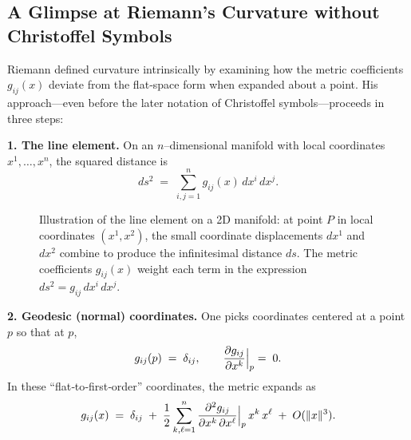 \subsection{A Glimpse at Riemann’s Curvature without Christoffel Symbols}

Riemann defined curvature intrinsically by examining how the metric coefficients \(g_{ij}(x)\) deviate from the flat‐space form when expanded about a point.  His approach—even before the later notation of Christoffel symbols—proceeds in three steps:

\textbf{1. The line element.}  On an \(n\)–dimensional manifold with local coordinates \(x^1,\dots,x^n\), the squared distance is
\[
ds^2 \;=\; \sum_{i,j=1}^n g_{ij}(x)\,dx^i\,dx^j.
\]


\begin{figure}[H]
    \centering
    \caption{%
    Illustration of the line element on a 2D manifold: at point \(P\) in local coordinates \((x^1,x^2)\), 
    the small coordinate displacements \(dx^1\) and \(dx^2\) combine to produce the infinitesimal distance \(ds\).  
    The metric coefficients \(g_{ij}(x)\) weight each term in the expression \(ds^2 = g_{ij}\,dx^i\,dx^j\).}
\end{figure}


\textbf{2. Geodesic (normal) coordinates.}  One picks coordinates centered at a point \(p\) so that at \(p\),
\[
g_{ij}(p) \;=\;\delta_{ij},
\qquad
\frac{\partial g_{ij}}{\partial x^k}\Bigl|_{p} \;=\;0.
\]
In these “flat‐to‐first‐order” coordinates, the metric expands as
\[
g_{ij}(x)
\;=\;
\delta_{ij}
\;+\;
\frac12
\sum_{k,\ell=1}^n
\frac{\partial^2 g_{ij}}{\partial x^k\,\partial x^\ell}\Bigl|_{p}
\,x^k\,x^\ell
\;+\;
O(\|x\|^3).
\]


